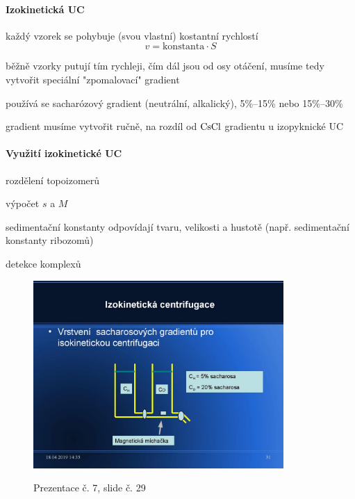 \documentclass[DIV=8]{scrreprt}
\begin{document}
\paragraph{Izokinetická UC}
\begin{myItemize}[nosep]
    \item každý vzorek se pohybuje (svou vlastní) kostantní rychlostí
    \[v = \text{konstanta} \cdot S\]
    \item běžně vzorky putují tím rychleji, čím dál jsou od osy otáčení, musíme tedy vytvořit speciální "zpomalovací" gradient
\begin{myItemize}[nosep]
    \item používá se sacharózový gradient (neutrální, alkalický), 5\%--15\% nebo 15\%--30\%
    \item gradient musíme vytvořit ručně, na rozdíl od \(\ce{CsCl}\) gradientu u izopyknické UC
\end{myItemize}

\end{myItemize}



\paragraph{Využití izokinetické UC}
\begin{myItemize}[nosep]
    \item rozdělení topoizomerů
    \item výpočet \(s\) a \(M\)
\begin{myItemize}[nosep]
    \item sedimentační konstanty odpovídají tvaru, velikosti a hustotě (např. sedimentační konstanty ribozomů)
\end{myItemize}

    \item detekce komplexů
\end{myItemize}



\begin{figure}
    \caption{Prezentace č. 7, slide č. 29}
    \includegraphics[width=0.85\textwidth]{slides-7/slide-29.jpg}
    \centering
    \label{slides-7-slide-29}
\end{figure}
\end{document}
